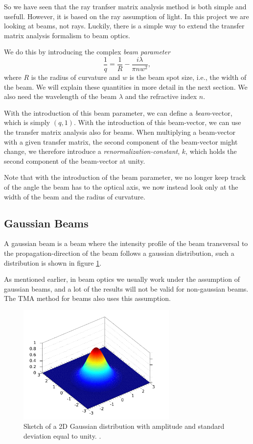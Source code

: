 \documentclass[a4paper, 11pt, notitlepage, english]{article}
\begin{document}
So we have seen that the ray tranfser matrix analysis method is both simple and usefull. However, it is based on the ray assumption of light. In this project we are looking at beams, not rays. Luckily, there is a simple way to extend the transfer matrix analysis formalism to beam optics.

We do this by introducing the complex \emph{beam parameter}
$$\frac{1}{q} = \frac{1}{R} - \frac{i\lambda}{\pi n w^2},$$
where $R$ is the radius of curvature and $w$ is the beam spot size, i.e., the width of the beam. We will explain these quantities in more detail in the next section. We also need the wavelength of the beam $\lambda$ and the refractive index $n$. 

With the introduction of this beam parameter, we can define a \emph{beam}-vector, which is simply $(q,1)$. With the introduction of this beam-vector, we can use the transfer matrix analysis also for beams. When multiplying a beam-vector with a given transfer matrix, the second component of the beam-vector might change, we therefore introduce a \emph{renormalization-constant}, $k$, which holds the second component of the beam-vector at unity.

Note that with the introduction of the beam parameter, we no longer keep track of the angle the beam has to the optical axis, we now instead look only at the width of the beam and the radius of curvature. 

\subsection{Gaussian Beams}

A gaussian beam is a beam where the intensity profile of the beam transversal to the propagation-direction of the beam follows a gaussian distribution, such a distribution is shown in figure \ref{fig:gauss_dist}.

As mentioned earlier, in beam optics we usually work under the assumption of gaussian beams, and a lot of the results will not be valid for non-gaussian beams. The TMA method for beams also uses this assumption.

\begin{figure}[htpb]
\centering
\includegraphics[width=0.7\textwidth]{Gaussian_2d}	
\caption{Sketch of a 2D Gaussian distribution with amplitude and standard deviation equal to unity. \label{fig:gauss_dist}.}
\end{figure}
\end{document}
